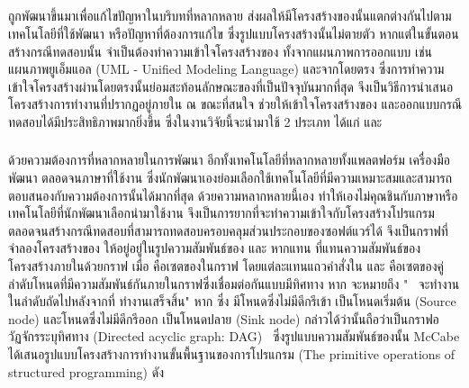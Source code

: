 \subsection{\ProgramGraph}
\label{sec:sub:pg}

{\software} ถูกพัฒนาขึ้นมาเพื่อแก้ไขปัญหาในบริบทที่หลากหลาย ส่งผลให้มีโครงสร้างของ{\sourcecode}นั้นแตกต่างกันไปตามเทคโนโลยีที่ใช้พัฒนา
หรือปัญหาที่ต้องการแก้ไข ซึ่งรูปแบบโครงสร้างนั้นไม่ตายตัว หากแต่ในขั้นตอนสร้างกรณีทดสอบนั้น\FirstTimeDefine{\tester}{\testerEN}
จำเป็นต้องทำความเข้าใจโครงสร้างของ{\software} ทั้งจากแผนภาพการออกแบบ เช่น แผนภาพยูเอ็มแอล (UML - Unified Modeling Language) 
และจาก{\sourcecode}โดยตรง ซึ่งการทำความเข้าใจโครงสร้างผ่าน{\sourcecode}โดยตรงนั้นย่อมสะท้อนลักษณะของ{\software}ที่เป็นปัจจุบันมากที่สุด
{\ProgramGraph} จึงเป็นวิธีการนำเสนอโครงสร้างการทำงานที่ปรากฏอยู่ภายใน{\software} ณ ขณะที่สนใจ 
ช่วยให้{\tester}เข้าใจโครงสร้างของ{\software} และออกแบบกรณีทดสอบได้มีประสิทธิภาพมากยิ่งขึ้น 
ซึ่งในงานวิจัยนี้จะนำ{\ProgramGraph}มาใช้ 2 ประเภท ได้แก่ \cfg และ \scg

\subsubsection{\FirstTimeDefine{\cfg}{\cfgen}}
\label{sec:sub:sub:cfg}

ด้วยความต้องการที่หลากหลายในการพัฒนา{\software} อีกทั้งเทคโนโลยีที่หลากหลายทั้งแพลตฟอร์ม เครื่องมือพัฒนา ตลอดจนภาษาที่ใช้งาน
ซึ่งนักพัฒนาเองย่อมเลือกใช้เทคโนโลยีที่มีความเหมาะสมและสามารถตอบสนองกับความต้องการนั้นได้มากที่สุด ด้วยความหลากหลายนี้เอง
ทำให้{\tester}เองไม่คุณชินกับภาษาหรือเทคโนโลยีที่นักพัฒนาเลือกนำมาใช้งาน จึงเป็นการยากที่จะทำความเข้าใจกับโครงสร้างโปรแกรม
ตลอดจนสร้างกรณีทดสอบที่สามารถทดสอบครอบคลุมส่วนประกอบของซอฟต์แวร์ได้ {\cfg} จึงเป็นกราฟที่จำลองโครงสร้างของ{\sourcecode}
ให้อยู่อยู่ในรูปความสัมพันธ์ของ {\Node} และ {\Edge}
หากแทน{\software}  ที่แทนความสัมพันธ์ของโครงสร้างภายในด้วยกราฟ  เมื่อ  
คือเซตของ{\Node}ในกราฟ โดยแต่ละ{\Node}แทนแถวคำสั่งใน{\sourcecode} และ  
คือเซตของคู่ลำดับโหนดที่มีความสัมพันธ์กันภายในกราฟซึ่งเชื่อมต่อกันแบบมีทิศทาง หาก  จะหมายถึง 
"\Node\  จะทำงานในลำดับถัดไปหลังจากที่  ทำงานเสร็จสิ้น" \cite{Jorgensen2013} 
หาก  ซึ่ง  มีโหนดซึ่งไม่มีดีกรีเข้า  เป็นโหนดเริ่มต้น (Source node) 
และโหนดซึ่งไม่มีดีกรีออก  เป็นโหนดปลาย (Sink node) 
กล่าวได้ว่า{\cfg}นั้นถือว่าเป็นกราฟอวัฏจักรระบุทิศทาง (Directed acyclic graph: DAG) \cite{Bang-Jensen2009}\ 
ซึ่งรูปแบบความสัมพันธ์ของ{\cfg}นั้น McCabe \cite{Watson1996} 
ได้เสนอรูปแบบโครงสร้างการทำงานขั้นพื้นฐานของการโปรแกรม (The primitive operations of structured programming) 
ดัง\figref{fig:graphtype}

